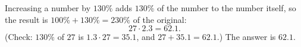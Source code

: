 Increasing a number by $130\%$ adds $130\%$ of the number to the number itself, so the result is $100\%+130\%=230\%$ of the original:
\[
27\cdot2.3=62.1 .
\]
(Check: $130\%$ of $27$ is $1.3\cdot27=35.1$, and $27+35.1=62.1$.) The answer is $\boxed{62.1}$.
